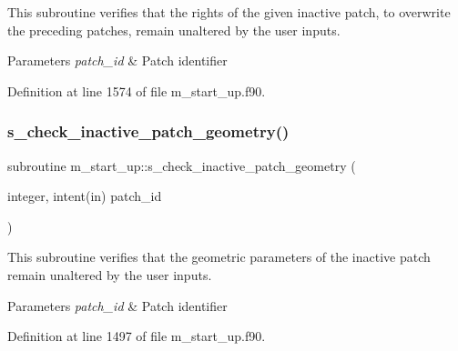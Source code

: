 This subroutine verifies that the rights of the given inactive patch, to overwrite the preceding patches, remain unaltered by the user inputs. 


\begin{DoxyParams}{Parameters}
{\em patch\+\_\+id} & Patch identifier \\
\hline
\end{DoxyParams}


Definition at line 1574 of file m\+\_\+start\+\_\+up.\+f90.

\mbox{\label{namespacem__start__up_a1a6b2eb124c5710f9078ea787be5d650}} 
\subsubsection{\texorpdfstring{s\+\_\+check\+\_\+inactive\+\_\+patch\+\_\+geometry()}{s\_check\_inactive\_patch\_geometry()}}
{\footnotesize\ttfamily subroutine m\+\_\+start\+\_\+up\+::s\+\_\+check\+\_\+inactive\+\_\+patch\+\_\+geometry (\begin{DoxyParamCaption}\item[{integer, intent(in)}]{patch\+\_\+id }\end{DoxyParamCaption})}



This subroutine verifies that the geometric parameters of the inactive patch remain unaltered by the user inputs. 


\begin{DoxyParams}{Parameters}
{\em patch\+\_\+id} & Patch identifier \\
\hline
\end{DoxyParams}


Definition at line 1497 of file m\+\_\+start\+\_\+up.\+f90.

\mbox{\label{namespacem__start__up_a3242a22615c7f69033b53d51df04ad02}} 
